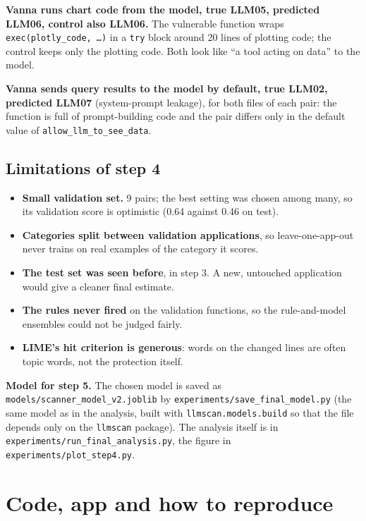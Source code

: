 \documentclass[11pt,a4paper]{article}
\newcommand{\code}[1]{\texttt{#1}}
\begin{document}
\textbf{Vanna runs chart code from the model, true LLM05, predicted LLM06, control also
LLM06.} The vulnerable function wraps \code{exec(plotly\_code, \ldots)} in a
\code{try} block around 20 lines of plotting code; the control keeps only the plotting
code. Both look like ``a tool acting on data'' to the model.

\textbf{Vanna sends query results to the model by default, true LLM02, predicted LLM07}
(system-prompt leakage), for both files of each pair: the function is full of
prompt-building code and the pair differs only in the default value of
\code{allow\_llm\_to\_see\_data}.

\subsection{Limitations of step 4}

\begin{itemize}
  \item \textbf{Small validation set.} 9 pairs; the best setting was chosen among many, so
        its validation score is optimistic (0.64 against 0.46 on test).
  \item \textbf{Categories split between validation applications}, so leave-one-app-out
        never trains on real examples of the category it scores.
  \item \textbf{The test set was seen before}, in step 3. A new, untouched application would
        give a cleaner final estimate.
  \item \textbf{The rules never fired} on the validation functions, so the rule-and-model
        ensembles could not be judged fairly.
  \item \textbf{LIME's hit criterion is generous}: words on the changed lines are often
        topic words, not the protection itself.
\end{itemize}

\textbf{Model for step 5.} The chosen model is saved as
\code{models/scanner\_model\_v2.joblib} by \code{experiments/save\_final\_model.py}
(the same model as in the analysis, built with \code{llmscan.models.build} so that the
file depends only on the \code{llmscan} package). The analysis itself is in
\code{experiments/run\_final\_analysis.py}, the figure in
\code{experiments/plot\_step4.py}.

\section{Code, app and how to reproduce}
\end{document}
